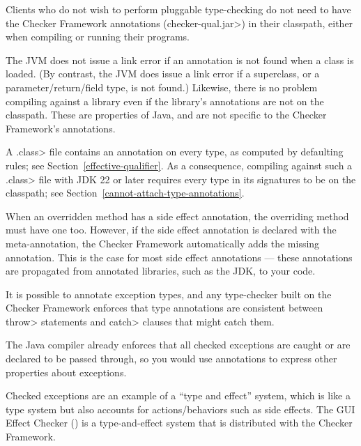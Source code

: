 Clients who do not wish to perform pluggable type-checking do not need to
have the Checker Framework annotations
(\<checker-qual.jar>) in their classpath, either when compiling or running
their programs.

The JVM does not issue a link error if an annotation is not found when a
class is loaded.  (By contrast, the JVM does issue a link error if a
superclass, or a parameter/return/field type, is not found.)
Likewise, there is no problem compiling against a library even if the
library's annotations are not on the classpath.
These are properties of Java, and are not specific to the Checker
Framework's annotations.



A \<.class> file contains an annotation on every type, as computed by
defaulting rules; see Section~\ref{effective-qualifier}.
As a consequence, compiling against such a \<.class> file with JDK 22 or
later requires every type in its signatures to be on the classpath; see
Section~\ref{cannot-attach-type-annotations}.

When an overridden method has a side effect annotation, the overriding
method must have one too.  However, if the side effect annotation is
declared with the 
meta-annotation, the Checker Framework automatically adds the missing
annotation.  This is the case for most side effect annotations --- these
annotations are propagated from annotated libraries, such as the JDK, to
your code.



It is possible to annotate exception types, and any type-checker built on the
Checker Framework enforces that type annotations are consistent between
\<throw> statements and \<catch> clauses that might catch them.

The Java compiler already enforces that all checked exceptions are caught
or are declared to be passed through, so you would use annotations to
express other properties about exceptions.

Checked exceptions are an example of a ``type and effect'' system, which is
like a type system but also accounts for actions/behaviors such as side
effects.  The GUI Effect Checker () is a
type-and-effect system that is distributed with the Checker Framework.


